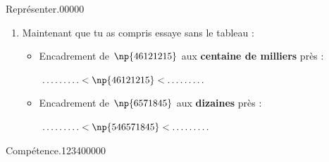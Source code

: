 \begin{pageAD}
\begin{ExoCadN}{Représenter.}{0}{0}{0}{0}{0}
\begin{enumerate}
\item Maintenant que tu as compris essaye sans le tableau :
\begin{itemize}
\item Encadrement de $\np{46121215}$ aux \textbf{centaine de milliers} près :

$\ldots\ldots\ldots<\np{46121215}<\ldots\ldots\ldots$
\item Encadrement de $\np{6571845}$ aux \textbf{dizaines} près :

$\ldots\ldots\ldots<\np{546571845}<\ldots\ldots\ldots$
\end{itemize}
\end{enumerate}
\end{ExoCadN}


\begin{ExoCad}{Compétence.}{1234}{0}{0}{0}{0}{0}

\end{ExoCad}
 
\end{pageAD} %


